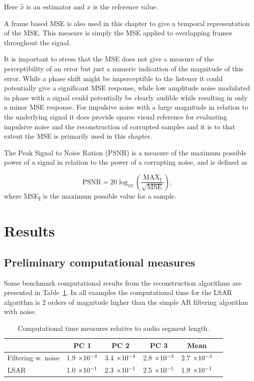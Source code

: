 Here $\hat{x}$ is an estimator and $x$ is the reference value.

A frame based MSE is also used in this chapter to give a temporal representation of the MSE. This measure is simply the MSE applied to overlapping frames throughout the signal.

It is important to stress that the MSE does not give a measure of the perceptibility of an error but just a numeric indication of the magnitude of this error. While a phase shift might be imperceptible to the listener it could potentially give a significant MSE response, while low amplitude noise modulated in phase with a signal could potentially be clearly audible while resulting in only a minor MSE response. For impulsive noise with a large magnitude in relation to the underlying signal it does provide sparse visual reference for evaluating impulsive noise and the reconstruction of corrupted samples and it is to that extent the MSE is primarily used in this chapter.

The Peak Signal to Noise Ration (PSNR) is a measure of the maximum possible power of a signal in relation to the power of a corrupting noise, and is defined as

\begin{equation}\label{eq:PSNRdef}
\textrm{PSNR} = 20 \log_{10} \left( \frac{\textrm{MAX}_\textrm{I}}{\sqrt{\textrm{MSE}}} \right),
\end{equation}
where MSE\textsubscript{I} is the maximum possible value for a sample.


\section{Results}
\subsection{Preliminary computational measures}
Some benchmark computational results from the reconstruction algorithms are presented in Table~\ref{tab:CompData}. In all examples the computational time for the LSAR algorithm is 2 orders of magnitude higher than the simple AR filtering algorithm with noise.

\begin{table}\begin{center}
\caption{Computational time measures relative to audio segment length.}
\label{tab:CompData}
\begin{tabular}{|l|c|c|c|c|c|}\hline
                        & PC 1              & PC 2              & PC 3              &  Mean \\ \hline
  Filtering w. noise    & 1.9 $\times 10^{-3}$    & 3.4 $\times 10^{-3}$    & 2.8 $\times 10^{-3}$    &  2.7 $\times 10^{-3}$  \\
  LSAR                  & 1.0 $\times 10^{-1}$    & 2.3 $\times 10^{-1}$    & 2.5 $\times 10^{-1}$    &  1.9 $\times 10^{-1}$  \\ \hline
\end{tabular}\end{center}\end{table}


